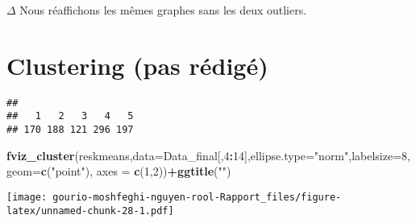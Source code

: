 \documentclass[
]{article}
\newenvironment{Shaded}{\begin{snugshade}}{\end{snugshade}}
\newcommand{\AttributeTok}[1]{\textcolor[rgb]{0.13,0.29,0.53}{#1}}
\newcommand{\DecValTok}[1]{\textcolor[rgb]{0.00,0.00,0.81}{#1}}
\newcommand{\FunctionTok}[1]{\textcolor[rgb]{0.13,0.29,0.53}{\textbf{#1}}}
\newcommand{\NormalTok}[1]{#1}
\newcommand{\OtherTok}[1]{\textcolor[rgb]{0.56,0.35,0.01}{#1}}
\newcommand{\SpecialCharTok}[1]{\textcolor[rgb]{0.81,0.36,0.00}{\textbf{#1}}}
\newcommand{\StringTok}[1]{\textcolor[rgb]{0.31,0.60,0.02}{#1}}
\begin{document}
\(\Delta\) Nous réaffichons les mêmes graphes sans les deux outliers.

\hypertarget{clustering-pas-ruxe9diguxe9}{%
\section{Clustering (pas rédigé)}\label{clustering-pas-ruxe9diguxe9}}

\begin{Shaded}
\end{Shaded}

\begin{verbatim}
## 
##   1   2   3   4   5 
## 170 188 121 296 197
\end{verbatim}

\begin{Shaded}
\begin{Highlighting}[]
\FunctionTok{fviz\_cluster}\NormalTok{(reskmeans,}\AttributeTok{data=}\NormalTok{Data\_final[,}\DecValTok{4}\SpecialCharTok{:}\DecValTok{14}\NormalTok{],}\AttributeTok{ellipse.type=}\StringTok{"norm"}\NormalTok{,}\AttributeTok{labelsize=}\DecValTok{8}\NormalTok{,}\AttributeTok{geom=}\FunctionTok{c}\NormalTok{(}\StringTok{"point"}\NormalTok{), }\AttributeTok{axes =} \FunctionTok{c}\NormalTok{(}\DecValTok{1}\NormalTok{,}\DecValTok{2}\NormalTok{))}\SpecialCharTok{+}\FunctionTok{ggtitle}\NormalTok{(}\StringTok{""}\NormalTok{)}
\end{Highlighting}
\end{Shaded}

\texttt{[image: gourio-moshfeghi-nguyen-rool-Rapport\_files/figure-latex/unnamed-chunk-28-1.pdf]}

\begin{Shaded}
\end{Shaded}
\end{document}
